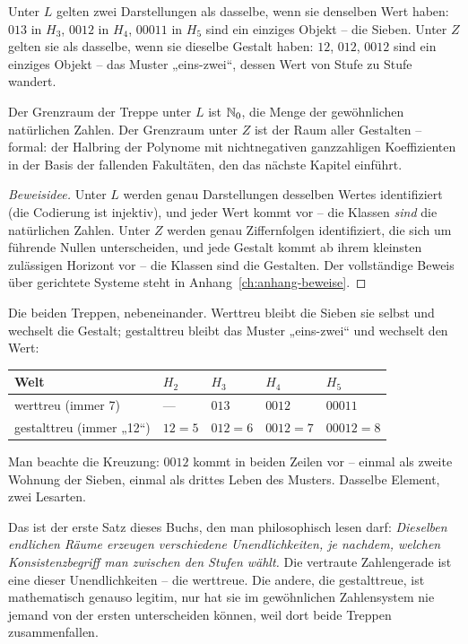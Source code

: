 Unter $L$ gelten zwei Darstellungen als dasselbe, wenn sie denselben
Wert haben: $013$ in $H_3$, $0012$ in $H_4$, $00011$ in $H_5$ sind
ein einziges Objekt -- die Sieben. Unter $Z$ gelten sie als
dasselbe, wenn sie dieselbe Gestalt haben: $12$, $012$, $0012$ sind
ein einziges Objekt -- das Muster „eins-zwei“, dessen Wert von
Stufe zu Stufe wandert.

\begin{satz}[Register S8]\label{satz:grenzen}
Der Grenzraum der Treppe unter $L$ ist $\mathbb N_0$, die Menge der
gewöhnlichen natürlichen Zahlen. Der Grenzraum unter $Z$ ist der
Raum aller Gestalten -- formal: der Halbring der Polynome mit
nichtnegativen ganzzahligen Koeffizienten in der Basis der
fallenden Fakultäten, den das nächste Kapitel einführt.
\end{satz}

\begin{proof}[Beweisidee]
Unter $L$ werden genau Darstellungen desselben Wertes identifiziert
(die Codierung ist injektiv), und jeder Wert kommt vor -- die
Klassen \emph{sind} die natürlichen Zahlen. Unter $Z$ werden genau
Ziffernfolgen identifiziert, die sich um führende Nullen
unterscheiden, und jede Gestalt kommt ab ihrem kleinsten zulässigen
Horizont vor -- die Klassen sind die Gestalten. Der vollständige
Beweis über gerichtete Systeme steht in Anhang~\ref{ch:anhang-beweise}.
\end{proof}

\begin{beispiel}
Die beiden Treppen, nebeneinander. Werttreu bleibt die Sieben sie
selbst und wechselt die Gestalt; gestalttreu bleibt das Muster
„eins-zwei“ und wechselt den Wert:
\begin{center}
\begin{tabular}{l|llll}
Welt & $H_2$ & $H_3$ & $H_4$ & $H_5$\\
\hline
werttreu (immer 7) & --- & $013$ & $0012$ & $00011$\\
gestalttreu (immer „12“) & $12=5$ & $012=6$ & $0012=7$ & $00012=8$\\
\end{tabular}
\end{center}
Man beachte die Kreuzung: $0012$ kommt in beiden Zeilen vor -- einmal
als zweite Wohnung der Sieben, einmal als drittes Leben des Musters.
Dasselbe Element, zwei Lesarten.
\end{beispiel}

Das ist der erste Satz dieses Buchs, den man philosophisch lesen
darf: \emph{Dieselben endlichen Räume erzeugen verschiedene
Unendlichkeiten, je nachdem, welchen Konsistenzbegriff man zwischen
den Stufen wählt.} Die vertraute Zahlengerade ist eine dieser
Unendlichkeiten -- die werttreue. Die andere, die gestalttreue, ist
mathematisch genauso legitim, nur hat sie im gewöhnlichen
Zahlensystem nie jemand von der ersten unterscheiden können, weil
dort beide Treppen zusammenfallen.

